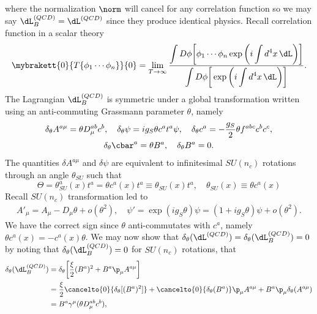 where the normalization $\norm$ will cancel for any correlation function so we may say $\dL^{(QCD)}_B = \dL^{(QCD)}$ since they produce identical physics. Recall correlation function in a scalar theory 
\begin{equation}
    \mybrakett{0}{T\{\phi_1\cdots\phi_n\}}{0} = \lim_{T \to \infty} \frac{\displaystyle\int D\phi\bigg[\phi_1\cdots\phi_n\exp{\bigg(i\displaystyle\int d^4x\,\dL\bigg)}\bigg]}{\displaystyle\int D\phi\bigg[\exp{\bigg(i\displaystyle\int d^4x\,\dL\bigg)}\bigg]}.
\end{equation}
The Lagrangian $\dL^{(QCD)}_B$ is symmetric under a global transformation written using an anti-commuting Grassmann parameter $\theta$, namely
\begin{gather}
    \delta_\theta A^{a\mu} = \theta D^{ab}_\mu c^b,\quad \delta_\theta\psi = ig_S\theta c^at^a\psi,\quad \delta_\theta c^a = -\frac{g_S}{2}\theta f^{abc}c^bc^c, \\
    \delta_\theta\cbar^a = \theta B^a,\quad \delta_\theta B^a = 0.
\end{gather}
The quantities $\delta A^{a\mu}$ and $\delta\psi$ are equivalent to infinitesimal $SU(n_c)$ rotations through an angle $\theta_{SU}$ such that 
\begin{equation}
    \Theta = \theta^a_{SU}(x)t^a = \theta c^a(x)t^a \equiv\theta_{SU}(x)t^a,\quad \theta_{SU}(x) \equiv \theta c^a(x)
\end{equation}
Recall $SU(n_c)$ transformation led to 
\begin{gather}
    A'_\mu = A_\mu - D_\mu\theta + o(\theta^2),\quad \psi' = \exp{(ig_S\theta)}\psi = (1 + ig_S\theta)\psi + o(\theta^2).
\end{gather}
We have the correct sign since $\theta$ anti-commutates with $c^a$, namely $\theta c^a(x) = -c^a(x)\theta$. We may now show that $\delta_\theta(\dL^{(QCD)}) = \delta_\theta(\dL_B^{(QCD)}) = 0$ by noting that $\delta_\theta(\dL^{(QCD)}_B) = 0$ for $SU(n_c)$ rotations, that 
\begin{equation}
    \begin{split}
        \delta_\theta(\dL^{(QCD)}_B) &= \delta_\theta\bigg[\frac{\xi}{2}(B^a)^2 + B^a\p_\mu A^{a\mu}\bigg] \\
        &= \frac{\xi}{2}\cancelto{0}{\delta_\theta[(B^a)^2]} + \cancelto{0}{\delta_\theta(B^a)}\p_\mu A^{a\mu} + B^a\p_\mu\delta_\theta(A^{a\mu}) \\
        &= B^a\gamma^\mu(\theta D_\mu^{ab}c^b),
    \end{split}
\end{equation}
